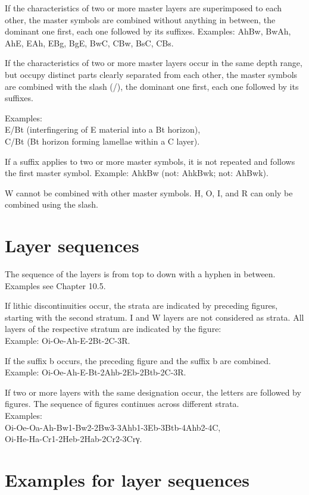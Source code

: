 \documentclass[
  letterpaper,
  DIV=11,
  numbers=noendperiod]{scrreprt}
\begin{document}
If the characteristics of two or more master layers are superimposed to
each other, the master symbols are combined without anything in between,
the dominant one first, each one followed by its suffixes. Examples:
AhBw, BwAh, AhE, EAh, EBg, BgE, BwC, CBw, BsC, CBs.

If the characteristics of two or more master layers occur in the same
depth range, but occupy distinct parts clearly separated from each
other, the master symbols are combined with the slash (/), the dominant
one first, each one followed by its suffixes.

Examples:\\
E/Bt (interfingering of E material into a Bt horizon),\\
C/Bt (Bt horizon forming lamellae within a C layer).

If a suffix applies to two or more master symbols, it is not repeated
and follows the first master symbol. Example: AhkBw (not: AhkBwk; not:
AhBwk).

W cannot be combined with other master symbols. H, O, I, and R can only
be combined using the slash.

\hypertarget{layer-sequences}{%
\section{Layer sequences}\label{layer-sequences}}

The sequence of the layers is from top to down with a hyphen in between.
Examples see Chapter 10.5.

If lithic discontinuities occur, the strata are indicated by preceding
figures, starting with the second stratum. I and W layers are not
considered as strata. All layers of the respective stratum are indicated
by the figure:\\
Example: Oi-Oe-Ah-E-2Bt-2C-3R.

If the suffix b occurs, the preceding figure and the suffix b are
combined.\\
Example: Oi-Oe-Ah-E-Bt-2Ahb-2Eb-2Btb-2C-3R.

If two or more layers with the same designation occur, the letters are
followed by figures. The sequence of figures continues across different
strata.\\
Examples:\\
Oi-Oe-Oa-Ah-Bw1-Bw2-2Bw3-3Ahb1-3Eb-3Btb-4Ahb2-4C,\\
Oi-He-Ha-Cr1-2Heb-2Hab-2Cr2-3Crγ.

\hypertarget{examples-for-layer-sequences}{%
\section{Examples for layer
sequences}\label{examples-for-layer-sequences}}
\end{document}

